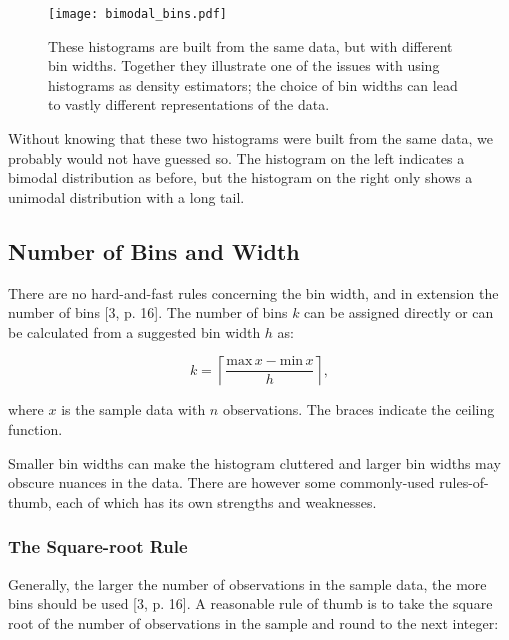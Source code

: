 \begin{figure}[H]
    \centering
    \texttt{[image: bimodal\_bins.pdf]}
    \caption{These histograms are built from the same data, but with different bin widths. Together they illustrate one of the issues with using histograms as density estimators; the choice of bin widths can lead to vastly different representations of the data.}
    \label{fig:bimodal_bins}
\end{figure}

Without knowing that these two histograms were built from the same data, we probably would not have guessed so. The histogram on the left indicates a bimodal distribution as before, but the histogram on the right only shows a unimodal distribution with a long tail.   


\subsection*{Number of Bins and Width}\label{sec:binning}


There are no hard-and-fast rules concerning the bin width, and in extension the number of bins [3, p. 16]. The number of bins $k$ can be assigned directly or can be calculated from a suggested bin width $h$ as:

\begin{equation}
    k = \left \lceil \frac{\mathrm{max}\, x - \mathrm{min}\, x}{h} \right \rceil, 
\end{equation}

where $x$ is the sample data with $n$ observations. The braces indicate the ceiling function.

Smaller bin widths can make the histogram cluttered and larger bin widths may obscure nuances in the data. There are however some commonly-used rules-of-thumb, each of which has its own strengths and weaknesses. 

\subsubsection*{The Square-root Rule}

Generally, the larger the number of observations in the sample data, the more bins should be used [3, p. 16]. A reasonable rule of thumb is to take the square root of the number of observations in the sample and round to the next integer:

